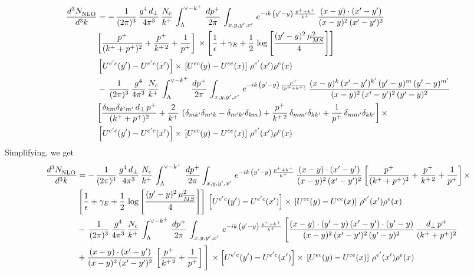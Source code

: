 \documentclass[9pt]{article}
\numberwithin{equation}{section}
\begin{document}
\begin{align}
     \frac{d^{3}N_{\rm NLO}^{\rm}}{d^{3}k}  & = -\,\frac{1}{(2\pi)^{3}}\,\frac{g^{4}\,d_{\perp}}{4\pi^{3}}\,\frac{N_{c}}{k^{+}}\,\int_{\Lambda}^{\vee-k^{+}}\, \frac{dp^{+}}{2\pi}\,\int_{x,y,y^{\prime},x'}\,e^{-ik\,\left(y'-y\right)\,\frac{p^{+}+k^{+}}{k^{+}}}\,\frac{(x-y)\cdot (x'-y')}{(x-y)^{2}\,(x'-y')^{2}}\notag \\ &  \bigg[\frac{p^{+}}{(k^{+}+p^{+})^{2}} + \frac{p^{+}}{k^{+\,2}}+\frac{1}{p^{+}}\bigg]\,\times\left[\frac{1}{\epsilon} +\gamma_{E} +\frac{1}{2}\,\log{\left[\frac{(y'-y)^{2}\,\mu^{2}_{\overline{MS}}}{4}\right]}\right]\notag \\ &  \left[U^{e'c}(y') - U^{e'c}(x')\right] \times\, \left[U^{ec}(y) - U^{ce}(x)\right]\, \rho^{e'}(x') \rho^{e}(x)\notag \\ & -\,\frac{1}{(2\pi)^{3}}\,\frac{g^{4}}{4\pi^{3}}\,\frac{N_{c}}{k^{+}}\,\int_{\Lambda}^{\vee-k^{+}}\, \frac{dp^{+}}{2\pi}\,\int_{x,y,y^{\prime},x'}\,e^{-ik\,\left(y'-y\right)\,\frac{p^{+}}{(p^{+}+k^{+})}}\,\frac{(x-y)^{k}\,(x'-y')^{k'}\,(y'-y)^{m}\,(y'-y)^{m'}}{(x-y)^{2}\,(x'-y')^{2}\,(y'-y)^{2}}\notag \\ &  \bigg[\frac{\delta_{km}\delta_{k'm'}\,d_{\perp}\,p^{+}}{(k^{+}+p^{+})^{2}}+\frac{2}{k^{+}}\,\left(\delta_{mk'}\delta_{m'k}-\delta_{m'k'}\delta_{km}\right) + \frac{p^{+}}{k^{+\,2}}\,\delta_{mm'}\delta_{kk'}+\frac{1}{p^{+}}\,\delta_{mm'}\delta_{kk'}\bigg]\,\times\notag \\ &  \left[U^{e'c}(y') - U^{e'c}(x')\right] \times\, \left[U^{ec}(y) - U^{ce}(x)\right]\, \rho^{e'}(x') \rho^{e}(x)
\end{align}
Simplifying, we get
\begin{align}
     \frac{d^{3}N_{\rm NLO}^{\rm}}{d^{3}k}  & = -\,\frac{1}{(2\pi)^{3}}\,\frac{g^{4}\,d_{\perp}}{4\pi^{3}}\,\frac{N_{c}}{k^{+}}\,\int_{\Lambda}^{\vee-k^{+}}\, \frac{dp^{+}}{2\pi}\int_{x,y,y^{\prime},x'}\,e^{-ik\,\left(y'-y\right)\,\frac{p^{+}+k^{+}}{k^{+}}}\,\frac{(x-y)\cdot (x'-y')}{(x-y)^{2}\,(x'-y')^{2}}\,\bigg[\frac{p^{+}}{(k^{+}+p^{+})^{2}} + \frac{p^{+}}{k^{+\,2}}+\frac{1}{p^{+}}\bigg]\,\times\notag \\ & \left[\frac{1}{\epsilon} +\gamma_{E} +\frac{1}{2}\,\log{\left[\frac{(y'-y)^{2}\,\mu^{2}_{\overline{MS}}}{4}\right]}\right]\,\left[U^{e'c}(y') - U^{e'c}(x')\right] \times\, \left[U^{ec}(y) - U^{ce}(x)\right]\, \rho^{e'}(x') \rho^{e}(x)\notag \\ & -\,\frac{1}{(2\pi)^{3}}\,\frac{g^{4}}{4\pi^{3}}\,\frac{N_{c}}{k^{+}}\,\int_{\Lambda}^{\vee-k^{+}}\, \frac{dp^{+}}{2\pi}\,\int_{x,y,y^{\prime},x'}\,e^{-ik\,\left(y'-y\right)\,\frac{p^{+}+k^{+}}{k^{+}}}\,\Bigg[\frac{(x-y)\cdot (y'-y)\, (x'-y')\cdot (y'-y)}{(x-y)^{2}\,(x'-y')^{2}\,(y'-y)^{2}}\,\frac{d_{\perp}\,p^{+}}{(k^{+}+p^{+})^{2}}\notag \\ & + \frac{(x-y)\cdot (x'-y')}{(x-y)^{2}\,(x'-y')^{2}}\,\left[\frac{p^{+}}{k^{+\,2}} + \frac{1}{p^{+}}\right]\Bigg]\,\times \left[U^{e'c}(y') - U^{e'c}(x')\right] \times\, \left[U^{ec}(y) - U^{ce}(x)\right]\, \rho^{e'}(x') \rho^{e}(x)
\end{align}
\end{document}
